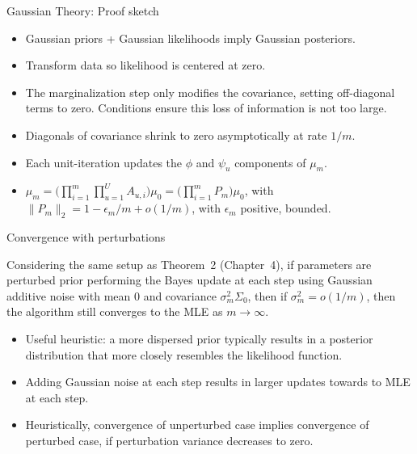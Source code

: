 \documentclass[aspectratio=169]{beamer}\usepackage[]{graphicx}\usepackage[]{xcolor}
\begin{document}
\begin{frame}{Gaussian Theory: Proof sketch}

\begin{itemize}
  \item Gaussian priors + Gaussian likelihoods imply Gaussian posteriors.
  \item Transform data so likelihood is centered at zero.
  \item The marginalization step only modifies the covariance, setting off-diagonal terms to zero. Conditions ensure this loss of information is not too large.
  \item Diagonals of covariance shrink to zero asymptotically at rate $1/m$.
  \item Each unit-iteration updates the $\phi$ and $\psi_u$ components of $\mu_m$.
  \item $\mu_m = \big(\prod_{i = 1}^m\prod_{u = 1}^U A_{u, i}\big) \mu_0 = \big(\prod_{i = 1}^m P_m\big) \mu_0$, with $\|P_m\|_2 = 1 - \epsilon_m/m + o(1/m)$, with $\epsilon_m$ positive, bounded.
\end{itemize}

\end{frame}

\begin{frame}{Convergence with perturbations}

    \begin{theorem}
    Considering the same setup as Theorem~2 (Chapter~4), if parameters are perturbed prior performing the Bayes update at each step using Gaussian additive noise with mean $0$ and covariance $\sigma^2_m\Sigma_0$, then if $\sigma_m^2 = o(1/m)$, then the algorithm still converges to the MLE as $m\rightarrow \infty$. 
  \end{theorem}
  
  \begin{itemize}
    \item Useful heuristic: a more dispersed prior typically results in a posterior distribution that more closely resembles the likelihood function.
    \item Adding Gaussian noise at each step results in larger updates towards to MLE at each step.
    \item Heuristically, convergence of unperturbed case implies convergence of perturbed case, if perturbation variance decreases to zero.
  \end{itemize}

\end{frame}
\end{document}
